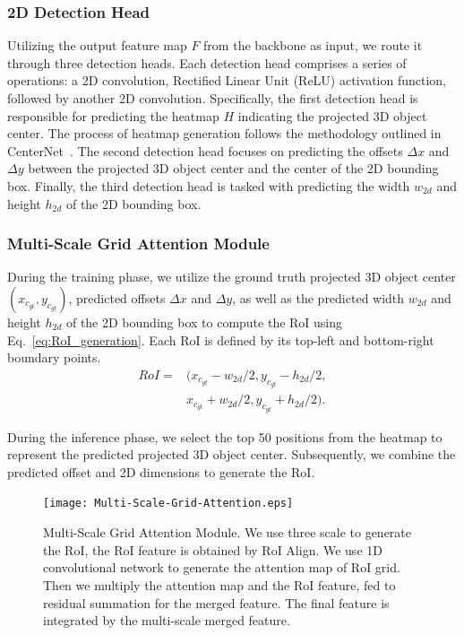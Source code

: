 \documentclass[journal]{IEEEtran}
\begin{document}
	\subsubsection{2D Detection Head}\label{2d_detection_head}
	Utilizing the output feature map $F$ from the backbone as input, we route it through three detection heads. Each detection head comprises a series of operations: a 2D convolution, Rectified Linear Unit (ReLU) activation function, followed by another 2D convolution. Specifically, the first detection head is responsible for predicting the heatmap $H$ indicating the projected 3D object center. The process of heatmap generation follows the methodology outlined in CenterNet~\cite{centernet}. The second detection head focuses on predicting the offsets $\Delta x$ and $\Delta y$ between the projected 3D object center and the center of the 2D bounding box. Finally, the third detection head is tasked with predicting the width $w_{2d}$ and height $h_{2d}$ of the 2D bounding box.
	
	\subsubsection{Multi-Scale Grid Attention Module}\label{msga}
	During the training phase, we utilize the ground truth projected 3D object center $(x_{c_{gt}}, y_{c_{gt}})$, predicted offsets $\Delta x$ and $\Delta y$, as well as the predicted width $w_{2d}$ and height $h_{2d}$ of the 2D bounding box to compute the RoI using Eq.~\eqref{eq:RoI_generation}. Each RoI is defined by its top-left and bottom-right boundary points.
	\begin{equation}
		\begin{aligned}
			RoI =& (x_{c_{gt}}-w_{2d}/2, y_{c_{gt}}-h_{2d}/2, \\
			&x_{c_{gt}}+w_{2d}/2, y_{c_{gt}}+h_{2d}/2)
			\label{eq:RoI_generation}.
		\end{aligned}
	\end{equation}
	
	During the inference phase, we select the top 50 positions from the heatmap to represent the predicted projected 3D object center. Subsequently, we combine the predicted offset and 2D dimensions to generate the RoI.
	\begin{figure}
		\centering
		\texttt{[image: Multi-Scale-Grid-Attention.eps]}
		\caption{Multi-Scale Grid Attention Module. We use three scale to generate the RoI, the RoI feature is obtained by RoI Align. We use 1D convolutional network to generate the attention map of RoI grid. Then we multiply the attention map and the RoI feature, fed to residual summation for the merged feature. The final feature is integrated by the multi-scale merged feature.} 
		\label{fig:multi-scale-grid-attention}
	\end{figure}
	
\end{document}
